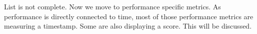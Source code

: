 















List is not complete.
Now we move to performance specific metrics.
As performance is directly connected to time, most of those performance metrics are measuring a timestamp.
Some are also displaying a score. 
This will be discussed.







 
 



